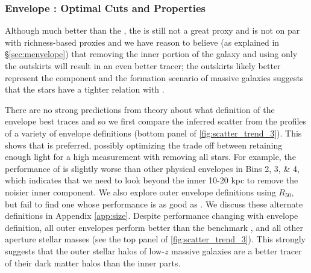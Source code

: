 \documentclass[fleqn,usenatbib,useAMS,english]{mnras}
\begin{document}
\subsubsection{Envelope \mstar{}: Optimal Cuts and \dsigma{} Properties}
    \label{sec:m100_outskirt}

    Although much better than the \mcmodel{}, the  is still not a great
    \mvir{} proxy and is not on par with richness-based proxies and we have reason to believe
    (as explained in \S \ref{sec:menvelope}) that removing the inner portion of the galaxy and
    using only the outskirts will result in an even better \mvir{} tracer;
    the outskirts likely better represent the \exsitu{} component and the formation scenario
    of massive galaxies suggests that the \exsitu{} stars have a tighter relation with \mvir{}.

    There are no strong predictions from theory about what definition of the envelope best traces
    \mvir{} and so we first compare the inferred scatter from the \dsigma{} profiles of a variety of
    envelope definitions (bottom panel of \ref{fig:scatter_trend_3}).
    This shows that  is preferred, possibly optimizing the trade off between retaining
    enough light for a high \snratio{} measurement with removing all \insitu{} stars.
    For example, the performance of  is slightly worse than other physical
    envelopes in Bins 2, 3, \& 4, which indicates that we need to look beyond the inner 10-20 kpc
    to remove the noisier inner component.
    We also explore outer envelope definitions using $R_{50}$, but fail to find one whose
    performance is as good as . We discuss these alternate definitions in
    Appendix \ref{app:size}.
    Despite performance changing with envelope definition, all outer envelopes perform better
    than the benchmark , and all other aperture stellar masses (see the top panel
    of \ref{fig:scatter_trend_3}). This strongly suggests that the outer stellar halos of
    low-$z$ massive galaxies are a better tracer of their dark matter halos than the inner parts.
\end{document}
